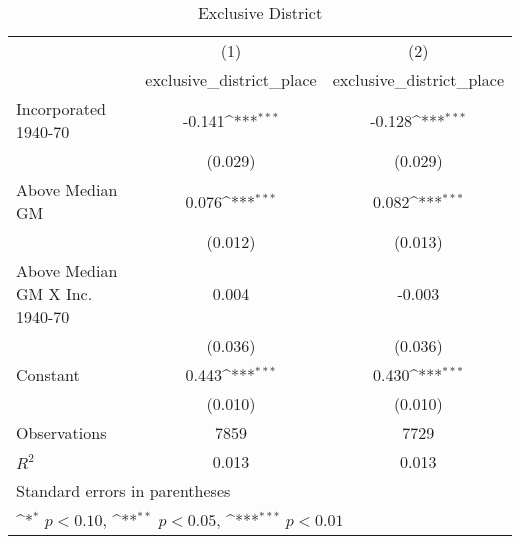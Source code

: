 \begin{table}[htbp]\centering
\def\sym#1{\ifmmode^{#1}\else\(^{#1}\)\fi}
\caption{Exclusive District}
\begin{tabular}{l*{2}{c}}
\hline\hline
                    &\multicolumn{1}{c}{(1)}&\multicolumn{1}{c}{(2)}\\
                    &\multicolumn{1}{c}{exclusive\_district\_place}&\multicolumn{1}{c}{exclusive\_district\_place}\\
\hline
Incorporated 1940-70&      -0.141\sym{***}&      -0.128\sym{***}\\
                    &     (0.029)         &     (0.029)         \\
[1em]
Above Median GM     &       0.076\sym{***}&       0.082\sym{***}\\
                    &     (0.012)         &     (0.013)         \\
[1em]
Above Median GM X Inc. 1940-70&       0.004         &      -0.003         \\
                    &     (0.036)         &     (0.036)         \\
[1em]
Constant            &       0.443\sym{***}&       0.430\sym{***}\\
                    &     (0.010)         &     (0.010)         \\
\hline
Observations        &        7859         &        7729         \\
\(R^{2}\)           &       0.013         &       0.013         \\
\hline\hline
\multicolumn{3}{l}{\footnotesize Standard errors in parentheses}\\
\multicolumn{3}{l}{\footnotesize \sym{*} \(p<0.10\), \sym{**} \(p<0.05\), \sym{***} \(p<0.01\)}\\
\end{tabular}
\end{table}
